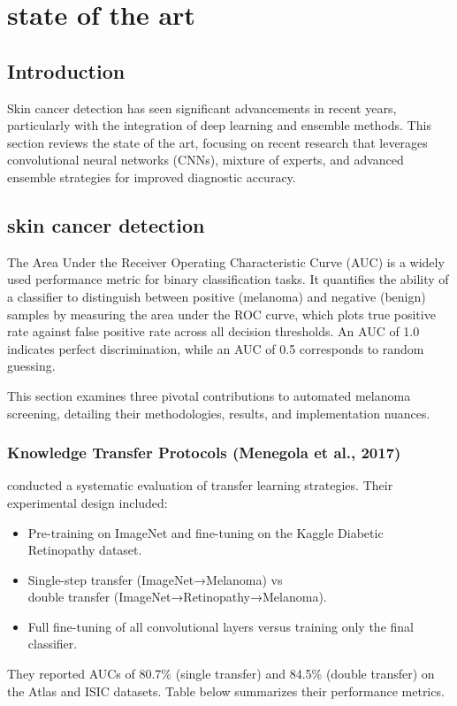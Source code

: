\chapter{state of the art}

\clearpage


\section{Introduction}
Skin cancer detection has seen significant advancements in recent years, particularly with the integration of deep learning and ensemble methods. This section reviews the state of the art, focusing on recent research that leverages convolutional neural networks (CNNs), mixture of experts, and advanced ensemble strategies for improved diagnostic accuracy.

\section{skin cancer detection}
The Area Under the Receiver Operating Characteristic Curve (AUC) is a widely used performance metric for binary classification tasks. It quantifies the ability of a classifier to distinguish between positive (melanoma) and negative (benign) samples by measuring the area under the ROC curve, which plots true positive rate against false positive rate across all decision thresholds. An AUC of 1.0 indicates perfect discrimination, while an AUC of 0.5 corresponds to random guessing.

This section examines three pivotal contributions to automated melanoma screening, detailing their methodologies, results, and implementation nuances.

\subsection{Knowledge Transfer Protocols (Menegola et al., 2017)}
\textcite{menegola2017knowledge} conducted a systematic evaluation of transfer learning strategies. Their experimental design included:
\begin{itemize}
  \item Pre-training on ImageNet and fine-tuning on the Kaggle Diabetic Retinopathy dataset.
  \item Single-step transfer (ImageNet→Melanoma) vs \\ double transfer (ImageNet→Retinopathy→Melanoma).
  \item Full fine-tuning of all convolutional layers versus training only the final classifier.
\end{itemize}
They reported AUCs of 80.7\% (single transfer) and 84.5\% (double transfer) on the Atlas and ISIC datasets. Table below summarizes their performance metrics.

